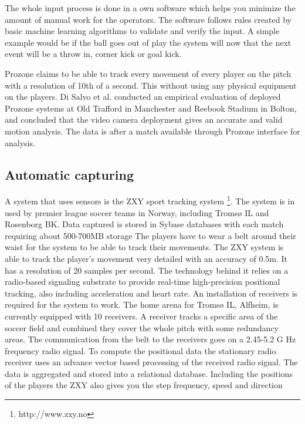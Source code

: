 The whole input process is done in a own software which helps you minimize the amount of manual work for the operators. The software follows rules created by basic machine learning algorithms to validate and verify the input. A simple example would be if the ball goes out of play the system will now that the next event will be a throw in, corner kick or goal kick.

Prozone claims to be able to track every movement of every player on the pitch with a resolution of 10th of a second. This without using any physical equipment on the players. Di Salvo et al. \cite{Prozone:validation} conducted an empirical evaluation of deployed Prozone systems at Old Trafford in Manchester and Reebook Stadium in Bolton, and concluded that the video camera deployment gives an accurate and valid motion analysis. The data is after a match available through Prozone interface for analysis. 

\subsection{Automatic capturing}

A system that uses sensors is the ZXY sport tracking system \footnote{http://www.zxy.no}. The system is in used by premier league soccer teams in Norway, including Tromsø IL and Rosenborg BK. Data captured is stored in Sybase databases with each match requiring about 500-700MB storage The players have to wear a belt around their waist for the system to be able to track their movements. The ZXY system is able to track the player’s movement very detailed with an accuracy of 0.5m. It has a resolution of 20 samples per second. The technology behind it relies on a radio-based signaling substrate to provide real-time high-precision positional tracking, also including acceleration and heart rate. An installation of receivers is required for the system to work. The home arena for Tromsø IL, Alfheim, is currently equipped with 10 receivers. A receiver tracks a specific area of the soccer field and combined they cover the whole pitch with some redundancy areas. The communication from the belt to the receivers goes on a 2.45-5.2 G Hz frequency radio signal. To compute the positional data the stationary radio receiver uses an advance vector based processing of the received radio signal. The data is aggregated and stored into a relational database. Including the positions of the players the ZXY also gives you the step frequency, speed and direction \cite{PTW}

